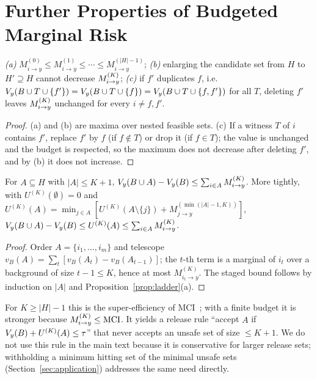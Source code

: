 \FloatBarrier
\section{Further Properties of Budgeted Marginal Risk}\label{app:proofs}

\begin{proposition}\label{prop:ladder}
\emph{(a)} $M^{(0)}_{i\to y}\le M^{(1)}_{i\to y}\le\cdots\le M^{(|H|-1)}_{i\to y}$;
\emph{(b)} enlarging the candidate set from $H$ to $H'\supseteq H$ cannot decrease $M^{(K)}_{i\to y}$;
\emph{(c)} if $f'$ duplicates $f$, i.e.\ $V_y(B\cup T\cup\{f'\})=V_y(B\cup T\cup\{f\})=V_y(B\cup T\cup\{f,f'\})$
for all $T$, deleting $f'$ leaves $M^{(K)}_{i\to y}$ unchanged for every $i\ne f,f'$.
\end{proposition}
\begin{proof}
(a) and (b) are maxima over nested feasible sets. (c) If a witness $T$ of $i$ contains $f'$,
replace $f'$ by $f$ (if $f\notin T$) or drop it (if $f\in T$); the value is unchanged and the budget
is respected, so the maximum does not decrease after deleting $f'$, and by (b) it does not increase.
\end{proof}

\begin{theorem}\label{thm:super}
For $A\subseteq H$ with $|A|\le K+1$, $V_y(B\cup A)-V_y(B)\le\sum_{i\in A}M^{(K)}_{i\to y}$. More tightly, with
$U^{(K)}(\emptyset)=0$ and $U^{(K)}(A)=\min_{j\in A}[U^{(K)}(A\setminus\{j\})+M^{(\min(|A|-1,K))}_{j\to y}]$,
$V_y(B\cup A)-V_y(B)\le U^{(K)}(A)\le\sum_{i\in A}M^{(K)}_{i\to y}$.
\end{theorem}
\begin{proof}
Order $A=\{i_1,\dots,i_m\}$ and telescope $v_B(A)=\sum_t[v_B(A_t)-v_B(A_{t-1})]$; the $t$-th term is a
marginal of $i_t$ over a background of size $t-1\le K$, hence at most $M^{(K)}_{i_t\to y}$. The staged
bound follows by induction on $|A|$ and Proposition~\ref{prop:ladder}(a).
\end{proof}
For $K\ge|H|-1$ this is the super-efficiency of MCI~\cite{catav2021mci}; with a finite budget it is
stronger because $M^{(K)}_{i\to y}\le\mathrm{MCI}$. It yields a release rule ``accept $A$ if $V_y(B)+U^{(K)}(A)\le\tau$''
that never accepts an unsafe set of size $\le K+1$. We do not use this rule in the main text because
it is conservative for larger release sets; withholding a minimum hitting set of the minimal unsafe sets
(Section~\ref{sec:application}) addresses the same need directly.

